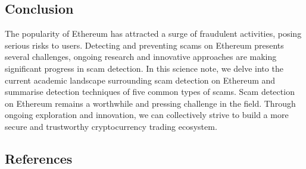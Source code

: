 \documentclass[letterpaper,10pt,english]{jupyterBook}
\begin{document}
\subsection{Conclusion}
\label{\detokenize{SDE/ScamDetec:conclusion}}
\sphinxAtStartPar
The popularity of Ethereum has attracted a surge of fraudulent activities, posing serious risks to users. Detecting and preventing scams on Ethereum presents several challenges, ongoing research and innovative approaches are making significant progress in scam detection. In this science note, we delve into the current academic landscape surrounding scam detection on Ethereum and summarise detection techniques of five common types of scams. Scam detection on Ethereum remains a worthwhile and pressing challenge in the field. Through ongoing exploration and innovation, we can collectively strive to build a more secure and trustworthy cryptocurrency trading ecosystem.




\subsection{References}
\label{\detokenize{SDE/ScamDetec:references}}
\sphinxstepscope
\end{document}
